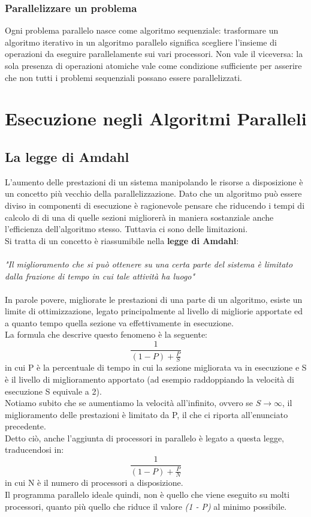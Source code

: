 \subsubsection{Parallelizzare un problema}
Ogni problema parallelo nasce come algoritmo sequenziale: trasformare un algoritmo iterativo in un algoritmo parallelo significa scegliere l'insieme di operazioni da eseguire parallelamente sui vari processori. Non vale il viceversa: la sola presenza di operazioni atomiche vale come condizione sufficiente per asserire che non tutti i problemi sequenziali possano essere parallelizzati.\\
\section{Esecuzione negli Algoritmi Paralleli}
\subsection{La legge di Amdahl}
L'aumento delle prestazioni di un sistema manipolando le risorse a disposizione è un concetto più vecchio della parallelizzazione. Dato che un algoritmo può essere diviso in componenti di esecuzione è ragionevole pensare che riducendo i tempi di calcolo di di una di quelle sezioni migliorerà in maniera sostanziale anche l'efficienza dell'algoritmo stesso. Tuttavia ci sono delle limitazioni.\\
Si tratta di un concetto è riassumibile nella \textbf{legge di Amdahl}:\\\\
\textit{"Il miglioramento che si può ottenere su una certa parte del sistema è limitato dalla frazione di tempo in cui tale attività ha luogo"}\\\\
In parole povere, migliorate le prestazioni di una parte di un algoritmo, esiste un limite di ottimizzazione, legato principalmente al livello di migliorie apportate ed a quanto tempo quella sezione va effettivamente in esecuzione.\\
La formula che descrive questo fenomeno è la seguente:
\begin{equation}
\frac{1}{(1 - P) + \frac{P}{S}}
\end{equation}
in cui P è la percentuale di tempo in cui la sezione migliorata va in esecuzione e S è il livello di miglioramento apportato (ad esempio raddoppiando la velocità di esecuzione S equivale a 2).\\
Notiamo subito che se aumentiamo la velocità all'infinito, ovvero se $\textit{S}\to\infty$, il miglioramento delle prestazioni è limitato da P, il che ci riporta all'enunciato precedente.\\
Detto ciò, anche l'aggiunta di processori in parallelo è legato a questa legge, traducendosi in:
\begin{equation}
\frac{1}{(1 - P) + \frac{P}{N}}
\end{equation}
in cui N è il numero di processori a disposizione.\\
Il programma parallelo ideale quindi, non è quello che viene eseguito su molti processori, quanto più quello che riduce il valore \textit{(1 - P)} al minimo possibile.
